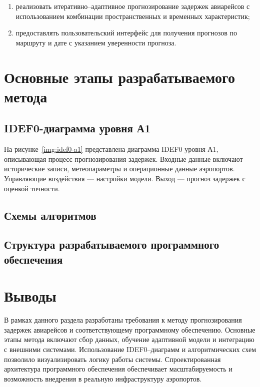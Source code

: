\begin{enumerate}[label=\arabic*)]
    \item реализовать итеративно--адаптивное прогнозирование задержек авиарейсов с использованием комбинации пространственных и временных характеристик;
    \item предоставлять пользовательский интерфейс для получения прогнозов по маршруту и дате с указанием уверенности прогноза.
\end{enumerate}


\section{Основные этапы разрабатываемого метода}
\subsection{IDEF0-диаграмма уровня А1}
На рисунке~\ref{img:idef0-a1} представлена диаграмма IDEF0 уровня А1, описывающая процесс прогнозирования задержек.
Входные данные включают исторические записи, метеопараметры и операционные данные аэропортов.
Управляющие воздействия — настройки модели.
Выход — прогноз задержек с оценкой точности.



\subsection{Схемы алгоритмов}

\subsection{Структура разрабатываемого программного обеспечения}

\section*{Выводы}
В рамках данного раздела разработаны требования к методу прогнозирования задержек авиарейсов и соответствующему программному обеспечению.
Основные этапы метода включают сбор данных, обучение адаптивной модели и интеграцию с внешними системами.
Использование IDEF0--диаграмм и алгоритмических схем позволило визуализировать логику работы системы.
Спроектированная архитектура программного обеспечения обеспечивает масштабируемость и возможность внедрения в реальную инфраструктуру аэропортов.

